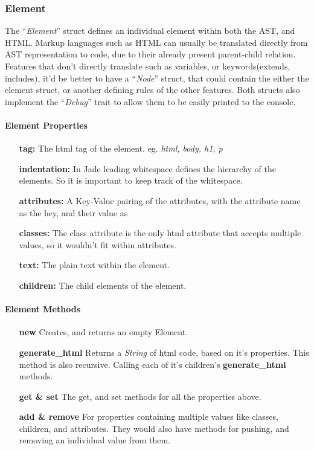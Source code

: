 \subsubsection{Element}
The ``\textit{Element}'' struct defines an individual element within both the AST, and HTML. Markup languages such as HTML can usually be translated directly from AST representation to code, due to their already present parent-child relation. Features that don't directly translate such as variables, or keywords(extends, includes), it'd be better to have a ``\textit{Node}'' struct, that could contain the either the element struct, or another defining rules of the other features. Both structs also implement the ``\textit{Debug}'' trait to allow them to be easily printed to the console.

\paragraph{Element Properties}
\begin{itemize}
    \item[\textbf{tag:}] The html tag of the element. eg. \textit{html, body, h1, p}
    \item[\textbf{indentation:}] In Jade leading whitespace defines the hierarchy of the elements. So it is important to keep track of the whitespace.
    \item[\textbf{attributes:}] A Key-Value pairing of the attributes, with the attribute name as the hey, and their value as 
    \item[\textbf{classes:}] The class attribute is the only html attribute that accepts multiple values, so it wouldn't fit within attributes.
    \item[\textbf{text:}] The plain text within the element.
    \item[\textbf{children:}] The child elements of the element.
\end{itemize}

\paragraph{Element Methods}
\begin{itemize}
    \item[\textbf{new}] Creates, and returns an empty Element.
    \item[\textbf{generate\_html}] Returns a \textit{String} of html code, based on it's properties. This method is also recursive. Calling each of it's children's \textbf{generate\_html} methods.
    \item[\textbf{get \& set}] The get, and set methods for all the properties above.
    \item[\textbf{add \& remove}] For properties containing multiple values like classes, children, and attributes. They would also have methods for pushing, and removing an individual value from them.
\end{itemize}

